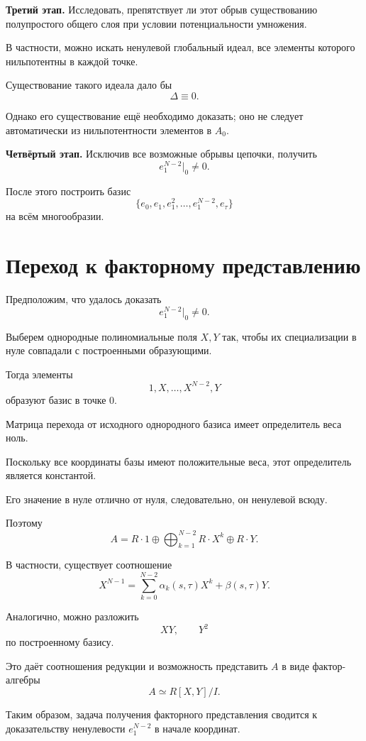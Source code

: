 \noindent
\textbf{Третий этап.}
Исследовать, препятствует ли этот обрыв
существованию полупростого общего слоя
при условии потенциальности умножения.

В частности, можно искать ненулевой
глобальный идеал, все элементы которого
нильпотентны в каждой точке.

Существование такого идеала дало бы
\[
\Delta\equiv0.
\]

Однако его существование ещё необходимо
доказать; оно не следует автоматически
из нильпотентности элементов в $A_0$.

\medskip

\noindent
\textbf{Четвёртый этап.}
Исключив все возможные обрывы цепочки,
получить
\[
e_1^{N-2}\big|_0\neq0.
\]

После этого построить базис
\[
\{e_0,e_1,e_1^2,\ldots,e_1^{N-2},e_\tau\}
\]
на всём многообразии.

\section{Переход к факторному представлению}

Предположим, что удалось доказать
\[
e_1^{N-2}\big|_0\neq0.
\]

Выберем однородные полиномиальные поля
$X,Y$ так, чтобы их специализации в нуле
совпадали с построенными образующими.

Тогда элементы
\[
1,X,\ldots,X^{N-2},Y
\]
образуют базис в точке $0$.

Матрица перехода от исходного
однородного базиса имеет определитель
веса ноль.

Поскольку все координаты базы имеют
положительные веса, этот определитель
является константой.

Его значение в нуле отлично от нуля,
следовательно, он ненулевой всюду.

Поэтому
\[
\boxed{
	A=
	R\cdot 1\oplus
	\bigoplus_{k=1}^{N-2}R\cdot X^k
	\oplus R\cdot Y.
}
\]

В частности, существует соотношение
\[
\boxed{
	X^{N-1}
	=
	\sum_{k=0}^{N-2}
	\alpha_k(s,\tau)X^k
	+\beta(s,\tau)Y.
}
\tag{4}
\]

Аналогично, можно разложить
\[
XY,\qquad Y^2
\]
по построенному базису.

Это даёт соотношения редукции
и возможность представить $A$
в виде фактор-алгебры
\[
A\simeq R[X,Y]/I.
\]

Таким образом, задача получения
факторного представления сводится
к доказательству ненулевости
$e_1^{N-2}$ в начале координат.

